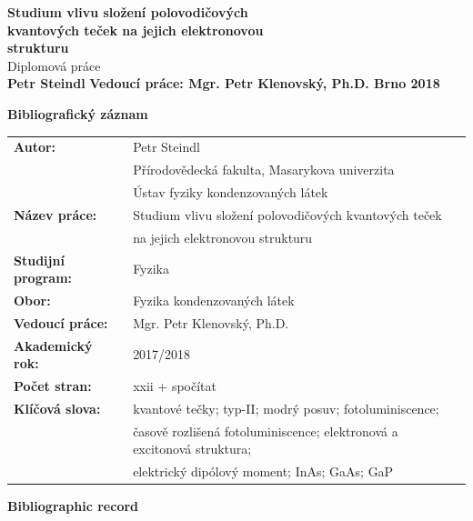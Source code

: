 \documentclass[
a4paper, %
11pt, %
onecolumn, %
openany, %
oldfontcommands,
]{memoir}
\begin{document}
\vspace{5cm}
\begingroup
\noindent %
\huge{\textbf{Studium vlivu složení polovodičových\\
		 kvantových teček na jejich elektronovou \\
		 strukturu}}
\vspace{0.5cm}\\
\Large{Diplomová práce}
\vspace{0.5cm}\\
\huge{\bfseries{Petr Steindl}}
\vfill
\noindent\normalsize\bfseries{Vedoucí práce: Mgr. Petr Klenovský, Ph.D. \hfill Brno 2018}
\endgroup

\newpage
\cleardoublepage
\Large\textbf{Bibliografický záznam}\\

\normalsize
\renewcommand{\arraystretch}{2}
\begin{tabular}{ll}
	\textbf{Autor:} & Petr Steindl\\[-0.5cm]
	& Přírodovědecká fakulta, Masarykova univerzita\\[-0.5cm]
	& Ústav fyziky kondenzovaných látek\\
	\textbf{Název práce:} & Studium vlivu složení polovodičových kvantových teček \\[-0.5cm]
	& na jejich elektronovou strukturu\\ 
	\textbf{Studijní program:}& Fyzika \\
	\textbf{Obor:}& Fyzika kondenzovaných látek \\
	\textbf{Vedoucí práce:}& Mgr. Petr Klenovský, Ph.D. \\
	\textbf{Akademický rok:}& 2017/2018 \\
	\textbf{Počet stran:}& xxii + spočítat \\
	\textbf{Klíčová slova:}& kvantové tečky; typ-II; modrý posuv; fotoluminiscence; \\[-0.5cm]
	&časově rozlišená fotoluminiscence; elektronová a excitonová struktura;\\[-0.5cm]
	& elektrický dipólový moment; InAs; GaAs; GaP \\
\end{tabular} 


\newpage
\cleardoublepage
\Large\textbf{Bibliographic record}\\
\end{document}
